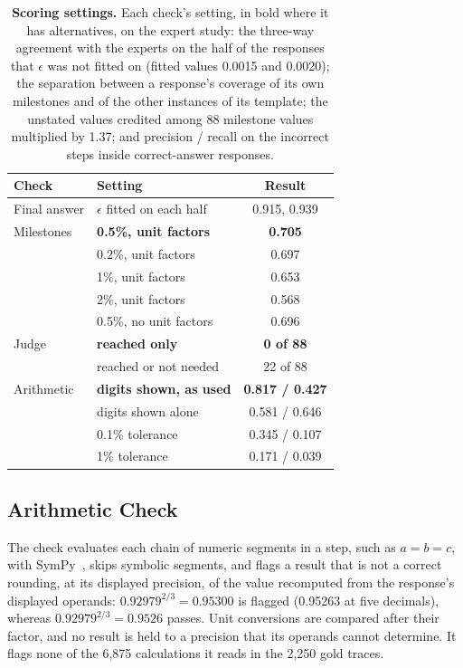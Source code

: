 \begin{table}[t]
    \centering
    \footnotesize
    \setlength{\tabcolsep}{3pt}
    \begin{tabular}{l|l|c}
        \toprule
        \rowcolor{gray!10}
        \textbf{Check} & \textbf{Setting} & \textbf{Result} \\
        \midrule
        Final answer & $\epsilon$ fitted on each half & 0.915, 0.939 \\
        \midrule
        Milestones & \textbf{0.5\%, unit factors} & \textbf{0.705} \\
        & 0.2\%, unit factors & 0.697 \\
        & 1\%, unit factors & 0.653 \\
        & 2\%, unit factors & 0.568 \\
        & 0.5\%, no unit factors & 0.696 \\
        \midrule
        Judge & \textbf{reached only} & \textbf{0 of 88} \\
        & reached or not needed & 22 of 88 \\
        \midrule
        Arithmetic & \textbf{digits shown, as used} & \textbf{0.817 / 0.427} \\
        & digits shown alone & 0.581 / 0.646 \\
        & 0.1\% tolerance & 0.345 / 0.107 \\
        & 1\% tolerance & 0.171 / 0.039 \\
        \bottomrule
    \end{tabular}
    \caption{\textbf{Scoring settings.} Each check's setting, in bold where it has alternatives, on
    the expert study: the three-way agreement with the experts on the half of the responses that
    $\epsilon$ was not fitted on (fitted values 0.0015 and 0.0020); the separation between a
    response's coverage of its own milestones and of the other instances of its template; the
    unstated values credited among 88 milestone values multiplied by 1.37; and precision / recall on
    the incorrect steps inside correct-answer responses.}
    \label{tab:scoring_settings}
\end{table}

\subsection{Arithmetic Check}

The check evaluates each chain of numeric segments in a step, such as $a = b = c$, with
SymPy~\citep{meurer2017sympy}, skips symbolic segments, and flags a result that is not a correct
rounding, at its displayed precision, of the value recomputed from the response's displayed
operands: $0.92979^{2/3} = 0.95300$ is flagged (0.95263 at five decimals), whereas
$0.92979^{2/3} = 0.9526$ passes.
Unit conversions are compared after their factor, and no result is held to a precision that its
operands cannot determine.
It flags none of the 6,875 calculations it reads in the 2,250 gold traces.

